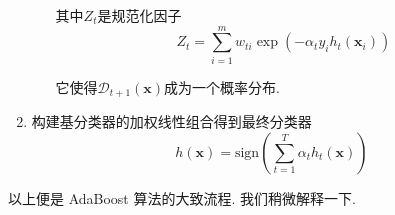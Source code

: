 \documentclass[a4paper,UTF8]{ctexart}
\theoremstyle{plain} \newtheorem{theorem}{定理}[section]
\theoremstyle{plain} \newtheorem{definition}{定义}[section]
\theoremstyle{plain} \newtheorem{lemma}{引理}[section]
\theoremstyle{plain} \newtheorem{proposition}{命题}[section]
\theoremstyle{plain} \newtheorem{example}{例}[section]
\theoremstyle{plain} \newtheorem{remark}{注}[section]
\theoremstyle{plain} \newtheorem{corollary}{推论}[section]
\begin{document}
\begin{enumerate}[(1)]
\begin{enumerate}[(a)]
其中$Z_t$是规范化因子
\begin{equation*}
Z_t = \sum_{i=1}^{m} w_{ti} \exp (- \alpha_{t} y_{i} h_{t}(\bm{x}_i))
\end{equation*}

它使得$\mathcal{D}_{t+1}(\bm{x})$成为一个概率分布.

\end{enumerate}

\item 构建基分类器的加权线性组合得到最终分类器
\begin{equation*}
h(\bm{x}) = \mathrm{sign}\left( \sum_{t=1}^{T} \alpha_{t} h_{t}(\bm{x}) \right)
\end{equation*}

\end{enumerate}

以上便是 AdaBoost 算法的大致流程. 我们稍微解释一下.
\end{document}
